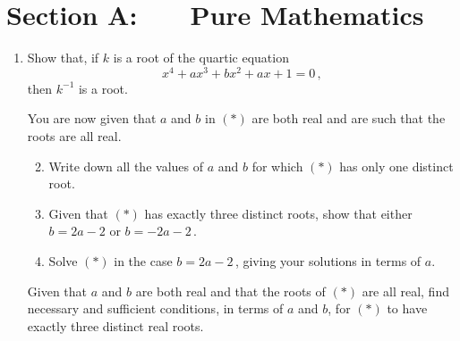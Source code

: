 \documentclass[a4, 11pt]{report}
\newlength{\qspace}
\newcounter{qnumber}
\newenvironment{question}%
 {\vspace{\qspace}
  \begin{enumerate}[\bfseries 1\quad][10]%
    \setcounter{enumi}{\value{qnumber}}%
    \item%
 }
{
  \end{enumerate}
  \filbreak
  \stepcounter{qnumber}
 }
\newenvironment{questionparts}[1][1]%
 {
  \begin{enumerate}[\bfseries (i)]%
    \setcounter{enumii}{#1}
    \addtocounter{enumii}{-1}
    \setlength{\itemsep}{5mm}
    \setlength{\parskip}{5pt}
 }
 {
  \end{enumerate}
 }
\begin{document}
\setcounter{page}{2}


 
\section*{Section A: \ \ \ Pure Mathematics}


\begin{question}
Show that, if $k$ is a root of   
the quartic equation
\[
x^4 + ax^3 + bx^2 + ax + 1 = 0\,,
\tag{$*$}
\]
then $k^{-1}$ is a root.

You are now given that $a$ and $b$ in $(*)$ are both
real and are such that the roots are all real.




\begin{questionparts}
\item Write down all
the values of $a$ and $b$ for which $(*)$ has only one
distinct root.

 \item
Given that $(*)$ has exactly three distinct roots, show that 
either $b=2a-2$ or \mbox{$b=-2a-2\,$}. 
 
\item 
 Solve $(*)$ in the  case 
$b= 2  a -2\,$,
giving your solutions in terms of $a$.

\end{questionparts}

Given that $a$ and $b$ are both real and that the roots of $(*)$
are all real, 
find
necessary and sufficient conditions, in terms of $a$ and $b$,
for $(*)$ to have 
exactly three distinct real roots.

\end{question}
\end{document}
